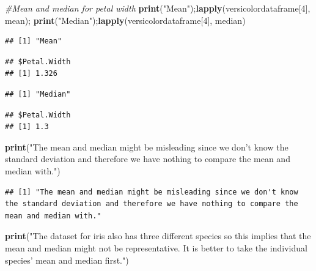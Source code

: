 \documentclass[]{article}
\newenvironment{Shaded}{\begin{snugshade}}{\end{snugshade}}
\newcommand{\CommentTok}[1]{\textcolor[rgb]{0.56,0.35,0.01}{\textit{#1}}}
\newcommand{\DecValTok}[1]{\textcolor[rgb]{0.00,0.00,0.81}{#1}}
\newcommand{\KeywordTok}[1]{\textcolor[rgb]{0.13,0.29,0.53}{\textbf{#1}}}
\newcommand{\NormalTok}[1]{#1}
\newcommand{\StringTok}[1]{\textcolor[rgb]{0.31,0.60,0.02}{#1}}
\begin{document}
\begin{Shaded}
\begin{Highlighting}[]
\CommentTok{#Mean and median for petal width}
\KeywordTok{print}\NormalTok{(}\StringTok{"Mean"}\NormalTok{);}\KeywordTok{lapply}\NormalTok{(versicolordataframe[}\DecValTok{4}\NormalTok{], mean); }\KeywordTok{print}\NormalTok{(}\StringTok{"Median"}\NormalTok{);}\KeywordTok{lapply}\NormalTok{(versicolordataframe[}\DecValTok{4}\NormalTok{], median)}
\end{Highlighting}
\end{Shaded}

\begin{verbatim}
## [1] "Mean"
\end{verbatim}

\begin{verbatim}
## $Petal.Width
## [1] 1.326
\end{verbatim}

\begin{verbatim}
## [1] "Median"
\end{verbatim}

\begin{verbatim}
## $Petal.Width
## [1] 1.3
\end{verbatim}

\begin{Shaded}
\begin{Highlighting}[]
\KeywordTok{print}\NormalTok{(}\StringTok{"The mean and median might be misleading since we don't know the standard deviation and therefore we have nothing to compare the mean and median with."}\NormalTok{)}
\end{Highlighting}
\end{Shaded}

\begin{verbatim}
## [1] "The mean and median might be misleading since we don't know the standard deviation and therefore we have nothing to compare the mean and median with."
\end{verbatim}

\begin{Shaded}
\begin{Highlighting}[]
\KeywordTok{print}\NormalTok{(}\StringTok{"The dataset for iris also has three different species so this implies that the mean and median might not be representative. It is better to take the individual species' mean and median first."}\NormalTok{)}
\end{Highlighting}
\end{Shaded}
\end{document}
